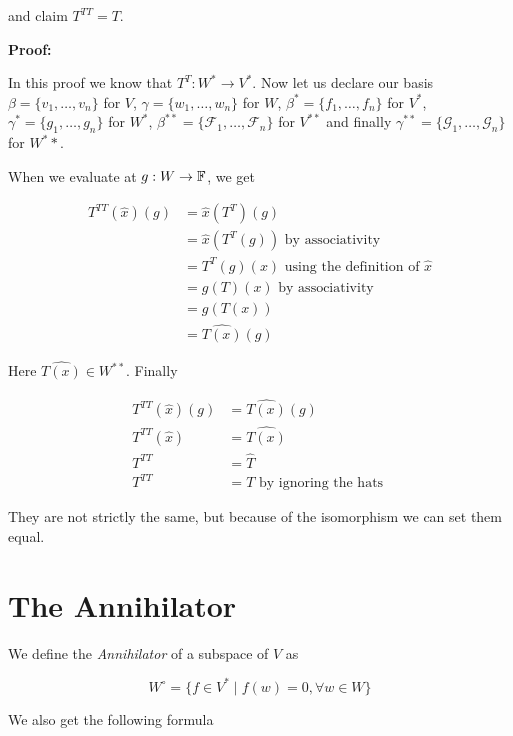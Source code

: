and claim \(T^{TT} = T\).

\textbf{Proof:}

In this proof we know that \(T^T: W^* \to V^*\). Now let us declare our basis \(\beta = \{v_1, \dots, v_n\}\) for \(V\), \(\gamma = \{w_1, \dots, w_n\} \) for \(W\), 
\(\beta^* = \{f_1, \dots, f_n\}\) for \(V^*\), \(\gamma^* = \{g_1, \dots, g_n\}\) for \(W^*\), \(\beta^{**} =\{\mathcal{F}_1, \dots, \mathcal{F}_n\}\) 
for \(V^{**}\) and finally \(\gamma^{**} = 
\{\mathcal{G}_1, \dots, \mathcal{G}_n\}\) for \(W^**\).


 When we evaluate at \(g: W \to \mathbb{F}\), we get 

\begin{align*}
    T^{TT} (\hat{x})(g) & = \hat{x}(T^T)(g)  \\ 
                        & = \hat{x} (T^T(g)) \text{ by associativity }\\
                        & =  T^T (g) (x)     \text{ using the definition of } \hat{x} \\ 
                        & = g(T)(x)          \text{ by associativity }\\
                        & = g(T(x))          \\ 
                        & = \hat{T(x)} (g)
\end{align*}

Here \(\hat{T(x)} \in W^{**}\). Finally 

\begin{align*} 
    T^{TT} (\hat{x})(g) & = \hat{T(x)} (g) \\ 
    T^{TT}(\hat{x}) &= \hat{T(x)} \\ 
    T^{TT}          &= \hat{T} \\
    T^{TT} &= T \text{ by ignoring the hats }
\end{align*}

They are not strictly the same, but because of the isomorphism we can set them equal.

\QED

\section{The Annihilator}

We define the \emph{Annihilator} of a subspace of \(V\) as 

\[
    W^{\circ} = \{f \in V^{*} \mid f(w) = 0, \forall w \in W\}
\]

We also get the following formula 

